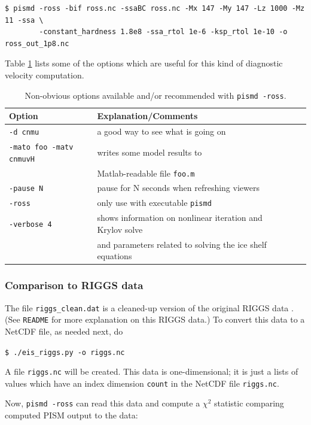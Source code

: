 \documentclass[11pt,final]{amsart}
\newcommand{\pismoptionindex}[1]{\index{options for PISM (and PETSc)!\texttt{-#1}}}
\begin{document}
\begin{verbatim}
$ pismd -ross -bif ross.nc -ssaBC ross.nc -Mx 147 -My 147 -Lz 1000 -Mz 11 -ssa \
        -constant_hardness 1.8e8 -ssa_rtol 1e-6 -ksp_rtol 1e-10 -o ross_out_1p8.nc
\end{verbatim}
\noindent Table \ref{tab:rossoptions} lists some of the options which are useful for this kind of diagnostic velocity computation.

\small
\begin{table}[ht]
\caption{Non-obvious options available and/or recommended with \texttt{pismd -ross}.}\label{tab:rossoptions}
\begin{tabular}{@{}llll}\hline
\textbf{Option} & \textbf{Explanation/Comments} \\ \hline
  \verb|-d cnmu| &       a good way to see what is going on \\
  \verb|-mato foo -matv cnmuvH|\pismoptionindex{mato}\pismoptionindex{matv} &  writes some model results to \\
    & Matlab-readable file \verb|foo.m| \\
  \verb|-pause N| &      pause for N seconds when refreshing viewers \\
  \verb|-ross| &         only use with executable \verb|pismd| \\
  \verb|-verbose 4| &      shows information on nonlinear iteration and Krylov solve \\
    & and parameters related to solving the ice shelf equations \\
\hline
\end{tabular}
\end{table}
\normalsize


\subsubsection*{Comparison to RIGGS data}  The file \verb|riggs_clean.dat| is a cleaned-up version of the original RIGGS\index{RIGGS} data \cite{RIGGS1, RIGGS2}.  (See \texttt{README} for more explanation on this RIGGS data.)  To convert this data to a NetCDF file, as needed next, do

\verb|$ ./eis_riggs.py -o riggs.nc|

\noindent A file \verb|riggs.nc| will be created.  This data is one-dimensional; it is just a lists of values which have an index dimension \verb|count| in the NetCDF file \verb|riggs.nc|.

Now, \verb|pismd -ross| can read this data and compute a $\chi^2$ statistic comparing computed PISM output to the data:
\end{document}

